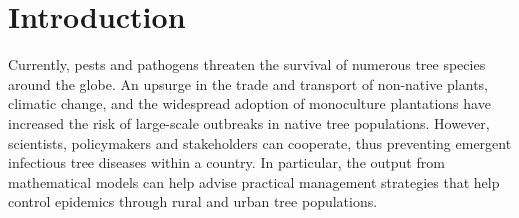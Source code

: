 
\chapter{Introduction}


Currently, pests and pathogens threaten the survival of numerous tree species around the globe. 
An upsurge in the trade and transport of non-native plants, climatic change, and the widespread adoption of monoculture plantations have increased the risk of large-scale outbreaks in native tree populations. 
However, scientists, policymakers and stakeholders can cooperate, thus preventing emergent infectious tree diseases within a country. 
In particular, the output from mathematical models can help advise practical management strategies that help control epidemics through rural and urban tree populations.

